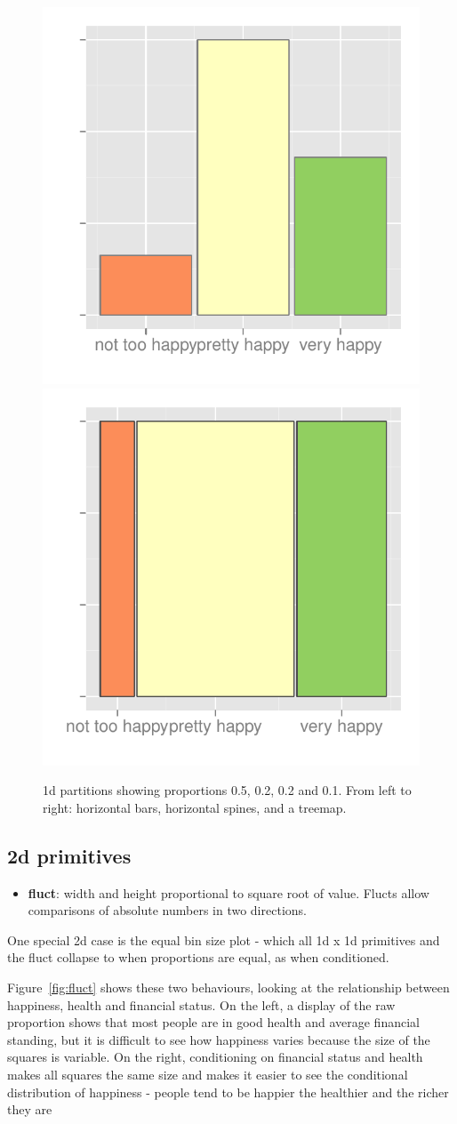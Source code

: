 \documentclass[letterpaper,oneside]{scrartcl}
\begin{document}
\begin{figure}[htbp]
  \centering
    \includegraphics[width=0.33\linewidth]{part-hbar}%
    \includegraphics[width=0.33\linewidth]{part-hspine}

  \caption{1d partitions showing proportions 0.5, 0.2, 0.2 and 0.1. From left to right: horizontal bars, horizontal spines, and a treemap.}
  \label{fig:part-1d}
\end{figure}


\subsection{2d primitives}

\begin{itemize}
  \item {\bf fluct}: width and height proportional to square root of value. Flucts allow comparisons of absolute numbers in two directions. 
  
\end{itemize}

One special 2d case is the equal bin size plot - which all 1d x 1d primitives and the fluct collapse to when proportions are equal, as when conditioned.

Figure~\ref{fig:fluct} shows these two behaviours, looking at the relationship between happiness, health and financial status. On the left, a display of the raw proportion shows that most people are in good health and average financial standing, but it is difficult to see how happiness varies because the size of the squares is variable. On the right, conditioning on financial status and health makes all squares the same size and makes it easier to see the conditional distribution of happiness - people tend to be happier the healthier and the richer they are
\end{document}
